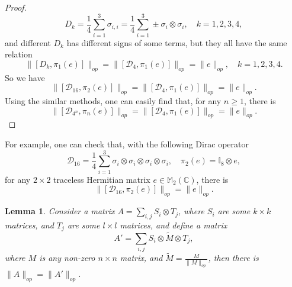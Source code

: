 \documentclass[a4paper,12pt]{article}
\newtheorem{lemma}{Lemma}
\begin{document}
\begin{proof}
\begin{equation}
	D_k = \frac{1}{4}  \sum_{i = 1}^3 \sigma_{i, i} = \frac{1}{4}  \sum_{i =
		1}^3 \pm \sigma_i \otimes \sigma_i, \quad k = 1, 2, 3, 4,
\end{equation}
and different $D_k$ has different signs of some terms, but they all have the
same relation
\begin{equation}
	\|[D_k, \pi_1 (e)]\|_{op} =\|[\mathcal{D}_4, \pi_1 (e)]\|_{op}= \|e\|_{op}, \quad k = 1, 2, 3, 4 .
\end{equation}
So we have
\begin{equation}
	\|[\mathcal{D}_{16}, \pi_2 (e)]\|_{op} = \|[\mathcal{D}_4, \pi_1 (e)]\|_{op}
	= \|e\|_{op} . 
\end{equation}
Using the similar methods, one can easily find that, for any $n \geqslant 1$, there is
\begin{equation}
	\|[\mathcal{D}_{4^n}, \pi_n (e)]\|_{op} = \|[\mathcal{D}_4, \pi_1 (e)]\|_{op}
	= \|e\|_{op} .
\end{equation}
\end{proof}

For example, one can check that, with the following Dirac operator
\begin{equation}
	\mathcal{D}_{16} = \frac{1}{4}  \sum_{i = 1}^3 \sigma_i \otimes \sigma_i
	\otimes \sigma_i \otimes \sigma_i, \quad {\pi_2}  (e) =\mathbb{I}_8 \otimes
	e,
\end{equation}
for any $2 \times 2$
traceless Hermitian matrix $e \in \mathbb{M}_2 (\mathbb{C})$, there is
\begin{equation}
	\|[\mathcal{D}_{16}, \pi_2 (e)]\|_{op} = \|e\|_{op} .
\end{equation}


\begin{lemma}
  Consider a matrix $A = \sum_{i, j} S_i \otimes T_j$, where $S_i$ are some $k
  \times k$ matrices, and $T_j$ are some $l \times l$ matrices, and define a
  matrix
  \begin{equation}
    A' = \sum_{i, j} S_i \otimes \tilde{M} \otimes T_j,
  \end{equation}
  where $M$ is any non-zero $n \times n$ matrix, and $\tilde{M} =
  \frac{M}{\|M\|_{op}}$, then there is $\|A\|_{op} = \|A' \|_{op}$.
\end{lemma}
\end{document}
